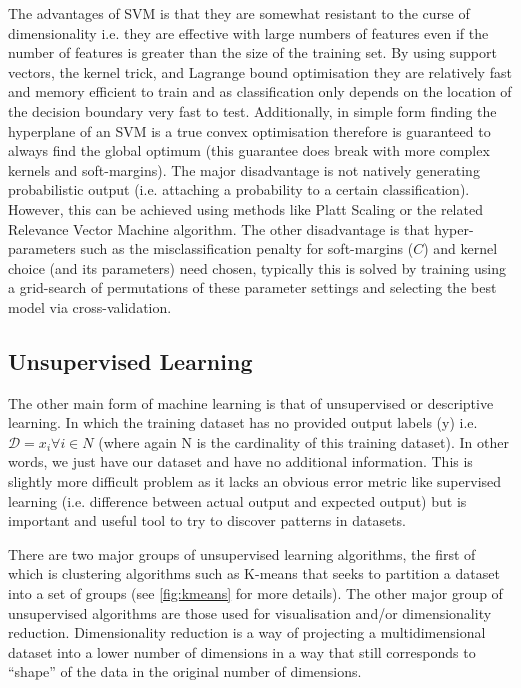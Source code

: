 The advantages of SVM is that they are somewhat resistant to the curse of dimensionality i.e. they are effective with large numbers of features
even if the number of features is greater than the size of the training set.%
By using support vectors, the kernel trick, and Lagrange bound optimisation 
they are relatively fast and memory efficient to train and as classification only depends on the location of the decision boundary very fast to test.
Additionally, in simple form finding the hyperplane of an SVM is a true convex optimisation therefore is guaranteed to always find the global optimum (this %
guarantee does break with more complex kernels and soft-margins).  
The major disadvantage is not natively generating probabilistic output (i.e. attaching a probability to a certain classification).  However, this can be achieved
using methods like Platt Scaling or the related Relevance Vector Machine algorithm.   The other disadvantage is that hyper-parameters such as the misclassification %
penalty for soft-margins (\(C\)) and kernel choice (and its parameters) need chosen, typically this is solved by training using a grid-search of permutations
of these parameter settings and selecting the best model via cross-validation.


\subsection{Unsupervised Learning}

The other main form of machine learning is that of unsupervised or descriptive learning.
In which the training dataset has no provided output labels (y) i.e. 
\(\mathcal{D} = {x_{i} \forall i \in N}\) (where again N is the cardinality of 
this training dataset). In other words, we just have our dataset and have no additional information.
This is slightly more difficult problem as it lacks an obvious error metric like supervised learning 
(i.e. difference between actual output and expected output) but is important and useful tool to
try to discover patterns in datasets.

There are two major groups of unsupervised learning algorithms, the first of which is clustering algorithms
such as K-means that seeks to partition a dataset into a set of groups (see \ref{fig:kmeans} for more details).
The other major group of unsupervised algorithms are those used for visualisation and/or
dimensionality reduction.  Dimensionality reduction is a way of projecting a multidimensional
dataset into a lower number of dimensions in a way that still corresponds to
``shape'' of the data in the original number of dimensions.  

